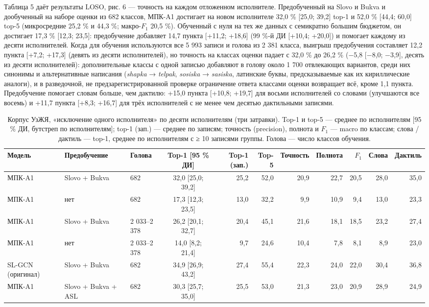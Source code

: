 Таблица 5 даёт результаты LOSO, рис. 6 --- точность на каждом отложенном исполнителе. Предобученный на Slovo и Bukva и дообученный на наборе оценки из 682 классов, МПК-A1 достигает на новом исполнителе 32,0 \% {[}25,0; 39,2{]} top-1 и 52,0 \% {[}44,4; 60,0{]} top-5 (микросредние 25,2 \% и 44,3 \%; макро-\(F_1\) 20,5 \%). Обученный с нуля на тех же данных с семикратно большим бюджетом, он достигает 17,3 \% {[}12,3; 23,5{]}: предобучение добавляет 14,7 пункта {[}+11,2; +18,6{]} (99 \%-й ДИ {[}+10,4; +20,0{]}) и помогает каждому из десяти исполнителей. Когда для обучения используются все 5 993 записи и голова из 2 381 класса, выигрыш предобучения составляет 12,2 пункта {[}+7,2; +17,3{]} (девять из десяти исполнителей), но точность на классах оценки падает с 32,0 \% до 26,2 \% (−5,8 {[}−8,0; −3,9{]}, десять из десяти исполнителей): дополнительные классы с одной записью добавляют в голову около 1 700 отвлекающих вариантов, среди них синонимы и альтернативные написания (\emph{shapka} → \emph{telpak}, \emph{sosiska} → \emph{sasiska}, латинские буквы, предсказываемые как их кириллические аналоги), и в разведочной, не предзарегистрированной проверке ограничение ответа классами оценки возвращает всё, кроме 1,1 пункта. Предобучение помогает словам больше, чем дактилю: +15,0 пункта {[}+10,8; +19,7{]} для восьми исполнителей со словами (улучшаются все восемь) и +11,7 пункта {[}+8,3; +16,7{]} для трёх исполнителей с не менее чем десятью дактильными записями.

\begin{table}[t]
\caption{Корпус УзЖЯ, «исключение одного исполнителя» по десяти исполнителям (три затравки). Top-1 и top-5 — среднее по исполнителям [95 \% ДИ, бутстреп по исполнителям]; top-1 (зап.) — среднее по записям; точность (precision), полнота и $F_1$ — macro по классам; слова / дактиль — top-1, среднее по исполнителям с ≥ 10 записями группы. Голова — число классов обучения.}\label{tab:loso}
\scriptsize\setlength{\tabcolsep}{3pt}
\centering
\begin{tabular}{lllcrrrrrrr}
\toprule
\textbf{Модель} & \textbf{Предобучение} & \textbf{Голова} & \textbf{Top-1 [95 \% ДИ]} & \textbf{Top-1 (зап.)} & \textbf{Top-5} & \textbf{Точность} & \textbf{Полнота} & \textbf{$F_1$} & \textbf{Слова} & \textbf{Дактиль} \\
\midrule
МПК-A1 & Slovo + Bukva & 682 & 32,0 [25,0; 39,2] & 25,2 & 52,0 & 20,9 & 22,7 & 20,5 & 28,0 & 35,0 \\
МПК-A1 & нет & 682 & 17,3 [12,3; 23,5] & 13,0 & 32,2 & 9,9 & 10,9 & 9,4 & 13,0 & 23,3 \\
МПК-A1 & Slovo + Bukva & 2 033–2 378 & 26,2 [20,1; 32,7] & 20,4 & 45,1 & 21,6 & 18,1 & 18,5 & 23,2 & 27,4 \\
МПК-A1 & нет & 2 033–2 378 & 14,0 [8,2; 21,4] & 9,7 & 24,6 & 10,4 & 7,8 & 8,1 & 8,9 & 23,0 \\
SL-GCN (оригинал) & Slovo + Bukva & 682 & 34,9 [26,9; 43,2] & 27,4 & 55,4 & 22,3 & 24,0 & 22,0 & 30,4 & 36,8 \\
МПК-A1 & Slovo + Bukva + ASL & 682 & 30,3 [25,7; 35,0] & 25,5 & 53,0 & 21,3 & 23,0 & 20,9 & 28,9 & 24,9 \\
\bottomrule
\end{tabular}
\end{table}

